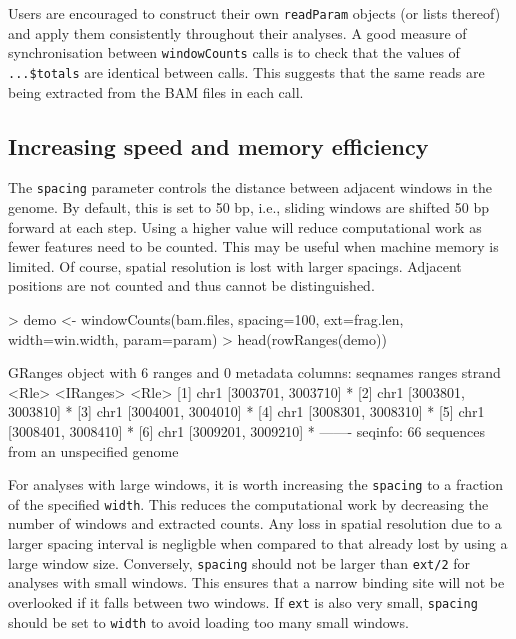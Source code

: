 \documentclass[12pt]{report}
\renewenvironment{Schunk}{\vspace{0pt}}{\vspace{0pt}}
\newcommand{\code}[1]{{\small\texttt{#1}}}
\begin{document}
Users are encouraged to construct their own \code{readParam} objects (or lists thereof) and apply them consistently throughout their analyses.
A good measure of synchronisation between \code{windowCounts} calls is to check that the values of \code{...\$totals} are identical between calls. 
This suggests that the same reads are being extracted from the BAM files in each call. 

\subsection{Increasing speed and memory efficiency}
\label{sec:efficiency}
The \code{spacing} parameter controls the distance between adjacent windows in the genome.
By default, this is set to 50 bp, i.e., sliding windows are shifted 50 bp forward at each step.
Using a higher value will reduce computational work as fewer features need to be counted.
This may be useful when machine memory is limited. 
Of course, spatial resolution is lost with larger spacings.
Adjacent positions are not counted and thus cannot be distinguished. 

\begin{Schunk}
\begin{Sinput}
> demo <- windowCounts(bam.files, spacing=100, ext=frag.len, width=win.width, param=param)
> head(rowRanges(demo))
\end{Sinput}
\begin{Soutput}
GRanges object with 6 ranges and 0 metadata columns:
      seqnames             ranges strand
         <Rle>          <IRanges>  <Rle>
  [1]     chr1 [3003701, 3003710]      *
  [2]     chr1 [3003801, 3003810]      *
  [3]     chr1 [3004001, 3004010]      *
  [4]     chr1 [3008301, 3008310]      *
  [5]     chr1 [3008401, 3008410]      *
  [6]     chr1 [3009201, 3009210]      *
  -------
  seqinfo: 66 sequences from an unspecified genome
\end{Soutput}
\end{Schunk}

For analyses with large windows, it is worth increasing the \code{spacing} to a fraction of the specified \code{width}. 
This reduces the computational work by decreasing the number of windows and extracted counts. 
Any loss in spatial resolution due to a larger spacing interval is negligble when compared to that already lost by using a large window size. 
Conversely, \code{spacing} should not be larger than \code{ext/2} for analyses with small windows.
This ensures that a narrow binding site will not be overlooked if it falls between two windows.
If \code{ext} is also very small, \code{spacing} should be set to \code{width} to avoid loading too many small windows.
\end{document}
